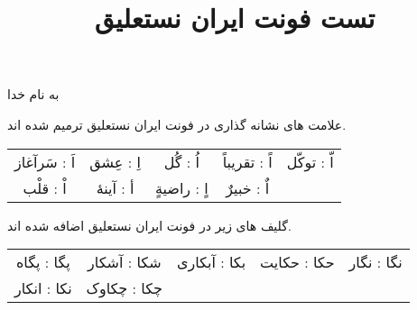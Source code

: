 \documentclass[14pt,a4paper]{article}
\begin{document}
\title{تست فونت ایران نستعلیق}
\author{ }\date{ }
\maketitle

\begin{center}
به نام خدا
\end{center}

علامت های نشانه گذاری در فونت ایران نستعلیق ترمیم شده اند.

\vspace{3mm}
\begin{tabular}{c c c c c}
 اَ : سَرآغاز & اِ : عِشق & اُ :‌ گُل & اً : تقریباً & اّ : توکّل \\
  اْ : قلْب & أ : آینهٔ & اٍ : راضیةٍ & اٌ : خبیرٌ & 
\end{tabular}
\vspace{3mm}

گلیف های زیر در فونت ایران نستعلیق اضافه شده اند.

\vspace{3mm}
\begin{tabular}{c c c c c}
پگا : پگاه & شکا : آشکار & بکا : آبکاری & حکا : حکایت & نگا : نگار 
\\
 نکا : انکار & چکا : چکاوک & & &
\end{tabular}
\vspace{3mm}
\end{document}
